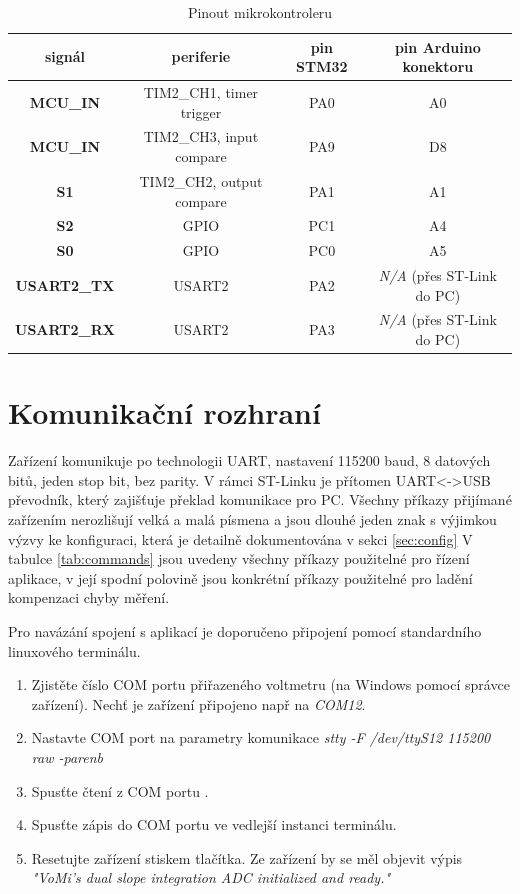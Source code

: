\documentclass[twoside]{article}
\begin{document}
\begin{table}[htbp]
    \centering
    \begin{tabular}{c|c|c|c}
        \textbf{signál} & \textbf{periferie} & \textbf{pin STM32} & \textbf{pin Arduino konektoru} \\ \hline 
        \textbf{MCU\_IN} & TIM2\_CH1, timer trigger & PA0 & A0 \\
        \textbf{MCU\_IN} & TIM2\_CH3, input compare & PA9 & D8 \\
        \textbf{S1} & TIM2\_CH2, output compare & PA1 & A1 \\
        \textbf{S2} & GPIO & PC1 & A4 \\
        \textbf{S0} & GPIO & PC0 & A5 \\
        \textbf{USART2\_TX} & USART2 & PA2 & \textit{N/A} (přes ST-Link do PC)\\
        \textbf{USART2\_RX} & USART2 & PA3 & \textit{N/A} (přes ST-Link do PC)
    \end{tabular}
    \caption{Pinout mikrokontroleru}
    \label{table:pinout}
\end{table}


\section{Komunikační rozhraní}

Zařízení komunikuje po technologii UART, nastavení 115200 baud, 8 datových bitů, jeden stop bit,
bez parity. V rámci ST-Linku je přítomen UART<->USB převodník, který zajišťuje překlad komunikace pro PC.
Všechny příkazy přijímané zařízením nerozlišují velká a malá písmena a jsou dlouhé jeden znak
s výjimkou výzvy ke konfiguraci, která je detailně dokumentována v sekci \ref{sec:config}
V tabulce \ref{tab:commands} jsou uvedeny všechny příkazy použitelné pro řízení aplikace,
v její spodní polovině jsou konkrétní příkazy použitelné pro ladění kompenzaci chyby měření.

Pro navázání spojení s aplikací je doporučeno připojení pomocí standardního linuxového terminálu.
\begin{enumerate}
    \item Zjistěte číslo COM portu přiřazeného voltmetru (na Windows pomocí správce zařízení). Nechť je zařízení připojeno např na \textit{COM12}.
    \item Nastavte COM port na parametry komunikace \textit{stty -F /dev/ttyS12 115200 raw -parenb}
    \item Spusťte čtení z COM portu .
    \item Spusťte zápis do COM portu  ve vedlejší instanci terminálu.
    \item Resetujte zařízení stiskem tlačítka. Ze zařízení by se měl objevit výpis \textit{"VoMi's dual slope integration ADC initialized and ready."}
\end{enumerate}
\end{document}
